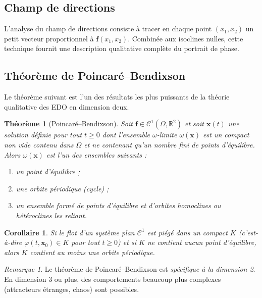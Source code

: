 \documentclass[12pt,a4paper,openany]{book}
\theoremstyle{definition}
\theoremstyle{plain}
\newtheorem{theoreme}[definition]{Théorème}
\newtheorem{corollaire}[definition]{Corollaire}
\theoremstyle{remark}
\newtheorem{remarque}[definition]{Remarque}
\newcommand{\R}{\mathbb{R}}
\begin{document}
\subsection{Champ de directions}
\label{subsec:champ-dir}

L'analyse du champ de directions consiste à tracer en chaque point
$(x_1, x_2)$ un petit vecteur proportionnel à
$\mathbf{f}(x_1, x_2)$. Combinée aux isoclines nulles, cette
technique fournit une description qualitative complète du portrait
de phase.

\subsection{Théorème de Poincaré--Bendixson}
\label{subsec:poincare-bendixson}

Le théorème suivant est l'un des résultats les plus puissants de la
théorie qualitative des EDO en dimension deux.

\begin{theoreme}[Poincaré--Bendixson]
\label{thm:poincare-bendixson}
Soit $\mathbf{f} \in \mathcal{C}^1(\Omega, \R^2)$ et soit
$\mathbf{x}(t)$ une solution définie pour tout $t \geq 0$ dont
l'ensemble $\omega$-limite
$\omega(\mathbf{x})$ est un compact non vide contenu dans $\Omega$
et ne contenant qu'un nombre fini de points d'équilibre.
Alors $\omega(\mathbf{x})$ est l'un des ensembles suivants :
\begin{enumerate}[label=(\roman*)]
  \item un point d'équilibre ;
  \item une orbite périodique (cycle) ;
  \item un ensemble formé de points d'équilibre et d'orbites
        homoclines ou hétéroclines les reliant.
\end{enumerate}
\end{theoreme}

\begin{corollaire}
\label{cor:PB-piege}
Si le flot d'un système plan $\mathcal{C}^1$ est piégé dans un
compact $K$ (c'est-à-dire $\varphi(t, \mathbf{x}_0) \in K$ pour
tout $t \geq 0$) et si $K$ ne contient aucun point d'équilibre,
alors $K$ contient au moins une orbite périodique.
\end{corollaire}

\begin{remarque}
Le théorème de Poincaré--Bendixson est \emph{spécifique à la
dimension 2}. En dimension $3$ ou plus, des comportements beaucoup
plus complexes (attracteurs étranges, chaos) sont possibles.
\end{remarque}
\end{document}
